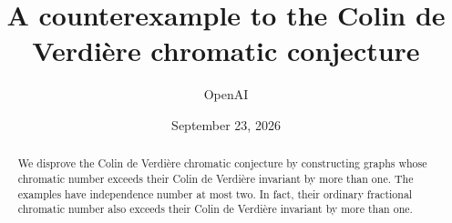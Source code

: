 \documentclass[11pt]{article}
\title{A counterexample to the Colin de Verdière chromatic conjecture}
\author{OpenAI}
\date{September 23, 2026}
\begin{document}
\maketitle
\begin{abstract}
We disprove the Colin de Verdière chromatic conjecture by constructing
graphs whose chromatic number exceeds their Colin de Verdière invariant
by more than one. The examples have independence number at most two.
In fact, their ordinary fractional chromatic number also exceeds their
Colin de Verdière invariant by more than one.
\end{abstract}
\tableofcontents
















\appendix


\clearpage


\end{document}
